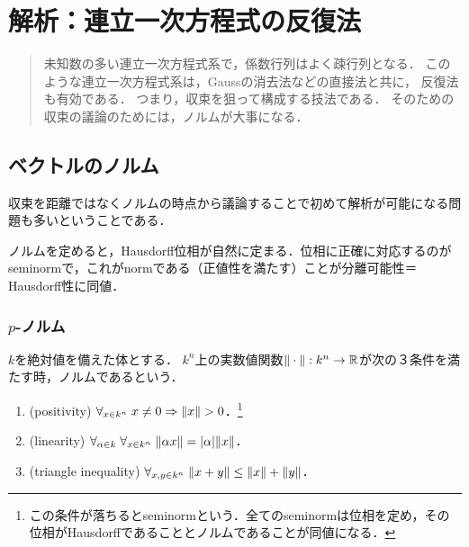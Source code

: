 \documentclass[uplatex, dvipdfmx]{jsreport}
\begin{document}
\chapter{解析：連立一次方程式の反復法}

\begin{quotation}
    未知数の多い連立一次方程式系で，係数行列はよく疎行列となる．
    このような連立一次方程式系は，Gaussの消去法などの直接法と共に，
    反復法も有効である．
    つまり，収束を狙って構成する技法である．
    そのための収束の議論のためには，ノルムが大事になる．
\end{quotation}

\section{ベクトルのノルム}

\begin{tcolorbox}[colframe=ForestGreen, colback=ForestGreen!10!white,breakable,colbacktitle=ForestGreen!40!white,coltitle=black,fonttitle=\bfseries\sffamily,
title=]
    収束を距離ではなくノルムの時点から議論することで初めて解析が可能になる問題も多いということである．

    ノルムを定めると，Hausdorff位相が自然に定まる．位相に正確に対応するのがseminormで，これがnormである（正値性を満たす）ことが分離可能性＝Hausdorff性に同値．
\end{tcolorbox}

\subsection{$p$-ノルム}

\begin{definition}[norm]
    $k$を絶対値を備えた体とする．
    $k^n$上の実数値関数$\|\cdot\|:k^n\to\mathbb{R}$が次の３条件を満たす時，ノルムであるという．
    \begin{enumerate}
        \item (positivity) $\forall_{x\in k^n}\;x\ne 0\Rightarrow\norm{x}> 0$．\footnote{この条件が落ちるとseminormという．全てのseminormは位相を定め，その位相がHausdorffであることとノルムであることが同値になる．}
        \item (linearity) $\forall_{\alpha\in k}\;\forall_{x\in k^n}\;\|\alpha x\|=\lvert\alpha\rvert\|x\|$．
        \item (triangle inequality) $\forall_{x,y\in k^n}\;\|x+y\|\le\|x\|+\|y\|$．
    \end{enumerate}
\end{definition}
\end{document}
